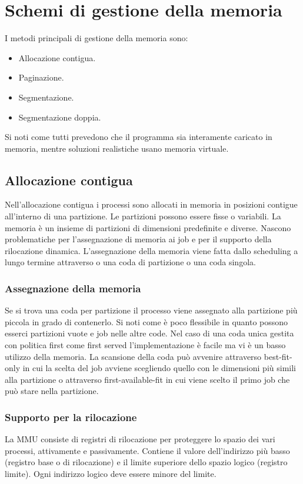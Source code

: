 \section{Schemi di gestione della memoria}
I metodi principali di gestione della memoria sono:
\begin{itemize}
	\item Allocazione contigua.
	\item Paginazione.
	\item Segmentazione.
	\item Segmentazione doppia.
\end{itemize}
Si noti come tutti prevedono che il programma sia interamente caricato in memoria, mentre soluzioni realistiche usano memoria virtuale. 
\subsection{Allocazione contigua}
Nell'allocazione contigua i processi sono allocati in memoria in posizioni contigue all'interno di una partizione. Le partizioni possono essere fisse o variabili. La memoria \`e un 
insieme di partizioni di dimensioni predefinite e diverse. Nascono problematiche per l'assegnazione di memoria ai job e per il supporto della rilocazione dinamica. L'assegnazione della
memoria viene fatta dallo scheduling a lungo termine attraverso o una coda di partizione o una coda singola. 
\subsubsection{Assegnazione della memoria}
Se si trova una coda per partizione il processo viene assegnato alla partizione pi\`u piccola in grado di contenerlo. Si noti come \`e poco flessibile in quanto possono esserci 
partizioni vuote e job nelle altre code. Nel caso di una coda unica gestita con politica first come first served l'implementazione \`e facile ma vi \`e un basso utilizzo della memoria. 
La scansione della coda pu\`o avvenire attraverso best-fit-only in cui la scelta del job avviene scegliendo quello con le dimensioni pi\`u simili alla partizione o attraverso
first-available-fit in cui viene scelto il primo job che pu\`o stare nella partizione. 	
\subsubsection{Supporto per la rilocazione}
La MMU consiste di registri di rilocazione per proteggere lo spazio dei vari processi, attivamente e passivamente. Contiene il valore dell'indirizzo pi\`u basso (registro base o di 
rilocazione) e il limite superiore dello spazio logico (registro limite). Ogni indirizzo logico deve essere minore del limite.
